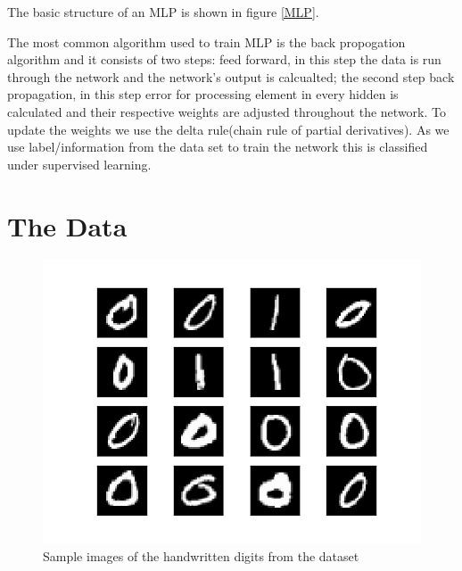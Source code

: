 \documentclass[conference]{IEEEtran}
\begin{document}
The basic structure of an MLP is shown in figure \ref{MLP}.  

The most common algorithm used to train MLP is the back propogation algorithm and it consists of two steps: feed forward, in this step the data is run through the network and the network's output is calcualted; the second step back propagation, in this step error for processing element in every hidden is calculated and their respective weights are adjusted throughout the network. To update the weights we use the delta rule(chain rule of partial derivatives). As we use label/information from the data set to train the network this is classified under supervised learning.


\section{The Data}

\begin{figure}[h!]
\centering
\includegraphics[scale=0.45]{Inputsample.png}
\caption{Sample images of the handwritten digits from the dataset}
\label{input}
\end{figure}
\end{document}
